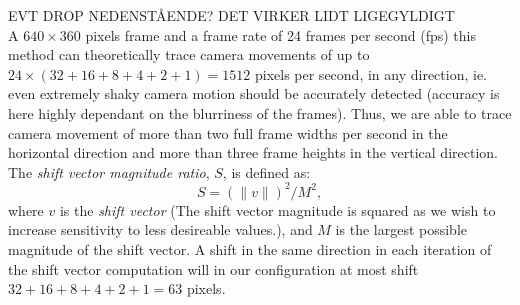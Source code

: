 %
EVT DROP NEDENSTÅENDE? DET VIRKER LIDT LIGEGYLDIGT\\
A $640\times360$ pixels frame and a frame rate of 24 frames per second (fps) this method can theoretically trace camera movements of up to $24 \times (32+16+8+4+2+1) = 1512$ pixels per second, in any direction, ie. even extremely shaky camera motion should be accurately detected (accuracy is here highly dependant on the blurriness of the frames). Thus, we are able to trace camera movement of more than two full frame widths per second in the horizontal direction and more than three frame heights in the vertical direction.\\
%
The \textit{shift vector magnitude ratio}, $S$, is defined as: %
\[
S = (\|v\|)^2 / M^2, 
\]
where $v$ is the \textit{shift vector} (The shift vector magnitude is squared as we wish to increase sensitivity to less desireable values.), and $M$ is the largest possible magnitude of the shift vector. A shift in the same direction in each iteration of the shift vector computation will in our configuration at most shift $32+16+8+4+2+1=63$ pixels.\\
%
